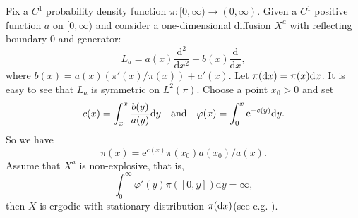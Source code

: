 \documentclass[12pt,reqno]{article}
\newcommand{\wt}{\color{magenta}}
\theoremstyle{definition}
\theoremstyle{remark}
\theoremstyle{example}
\numberwithin{equation}{section}
\newcommand{\scr}[1]{\mathscr #1}
\def\d{\mathrm{d}}
\def\e{\scr E}
\def\bR{\mathbb R}
\def\d{\rm d}
\def\d{{\mbox{\rm d}}}
\begin{document}
Fix a $C^1$ probability density function ${\pi}:[0,\infty)\rightarrow (0,\infty)$.
Given a $C^1$ positive function $a$ on $[0,\infty)$ and consider a one-dimensional diffusion  $X^a$ with reflecting boundary 0 and generator:
\begin{equation}\label{1d-generator}
  L_a=a(x)\frac{\mathrm{d}^2}{\mathrm{d}x^2}+b(x)\frac{\mathrm{d}}{\mathrm{d}x},
\end{equation} %
where $b(x)=a(x)({\pi}'(x)/{\pi}(x))+a'(x)$. Let $\pi(\d x)=\pi(x)\d x$. It is easy to see that $L_a$ is symmetric on $L^2({\pi})$. Choose a point $x_0>0$ and set $$c(x)=\int_{x_0}^{x}\frac{b(y)}{a(y)}\mathrm{d}y\quad\text{and}\quad \varphi(x)=\int_{0}^x\mathrm{e}^{-c(y)}\d y.$$
So we have
\begin{equation}\label{pi}
	{\pi}(x)= {{\mathrm e}^{c(x)}{\pi}(x_0)a(x_0)}/{a(x)}.
\end{equation}
Assume that  $X^a$ is non-explosive,
that is,
$$\int_{0}^{\infty}\varphi'(y)\pi([0,y])\mathrm{d}y=\infty,
$$
then  $X$ is ergodic with stationary distribution $\pi(\d x)$(see e.g. \cite[Table 5.1]{cmf05}).
\end{document}
